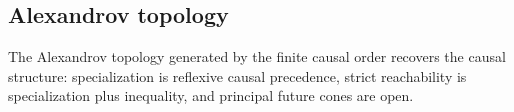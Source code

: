 \subsection{Alexandrov topology}

\begin{theorem}\label{thm:causal-alexandrov-topology}\leanok{}
The Alexandrov topology generated by the finite causal order recovers the
causal structure: specialization is reflexive causal precedence, strict
reachability is specialization plus inequality, and principal future cones
are open.
\end{theorem}

